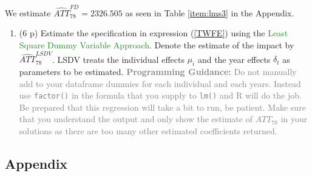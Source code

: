 \documentclass[
]{article}
\newenvironment{Shaded}{\begin{snugshade}}{\end{snugshade}}
\newcommand{\AttributeTok}[1]{\textcolor[rgb]{0.77,0.63,0.00}{#1}}
\newcommand{\FunctionTok}[1]{\textcolor[rgb]{0.00,0.00,0.00}{#1}}
\newcommand{\NormalTok}[1]{#1}
\newcommand{\OtherTok}[1]{\textcolor[rgb]{0.56,0.35,0.01}{#1}}
\newcommand{\SpecialCharTok}[1]{\textcolor[rgb]{0.00,0.00,0.00}{#1}}
\providecommand{\tightlist}{%
  \setlength{\itemsep}{0pt}\setlength{\parskip}{0pt}}
\begin{document}
\begin{Shaded}
\end{Shaded}

We estimate \(\widehat{ATT}_{78}^{FD} = 2326.505\) as seen in Table
\ref{item:lms3} in the Appendix.

\begin{enumerate}
\def\labelenumi{\arabic{enumi}.}
\setcounter{enumi}{2}
\tightlist
\item
  (6 p) Estimate the specification in expression (\ref{TWFE}) using the
  \textcolor{ForestGreen}{Least Square Dummy Variable Approach}. Denote
  the estimate of the impact by \(\widehat{ATT}_{78}^{LSDV}\). LSDV
  treats the individual effects \(\mu_i\) and the year effects
  \(\delta_t\) as parameters to be estimated.
  \textcolor{Gray}{\textbf{Programming Guidance:} Do not manually add to your dataframe dummies for each individual and each years. Instead use \texttt{factor()} in the formula that you supply to \texttt{lm()} and R will do the job. Be prepared that this regression will take a bit to run, be patient. Make sure that you understand the output and only show the estimate of ${ATT}_{78}$ in your solutions as there are too many other estimated coefficients returned.}\label{item:lsdv}
\end{enumerate}

\newpage

\hypertarget{appendix}{%
\subsection{Appendix}\label{appendix}}
\end{document}
